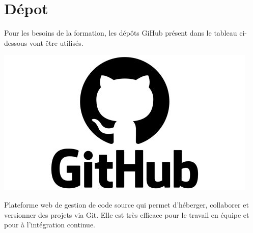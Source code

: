 \documentclass[french, 12pt]{article}%
\newcommand{\titreencadre}{Titre}
\newenvironment{encadre}[1]{\renewcommand{\titreencadre}{#1}
	\begin{mdframed}[style=encadrestyle]
	\vspace{0.5\baselineskip}
	}{%
	\end{mdframed}}
\begin{document}
\section{Dépot}

\begin{minipage}{0.65\linewidth}
Pour les besoins de la formation, les dépôts GiHub présent dans le tableau ci-dessous vont être utilisés.
\end{minipage}
\begin{minipage}{0.34\linewidth}
\begin{center}
\includegraphics[scale=0.25]{./ressource/logoGit.jpeg}
\end{center}
\end{minipage}




\begin{encadre}{GitHub }
Plateforme web de gestion de code source qui permet d'héberger, collaborer et versionner des projets via Git. Elle est très efficace pour le travail en équipe et pour à l’intégration continue.
\end{encadre}
\end{document}
